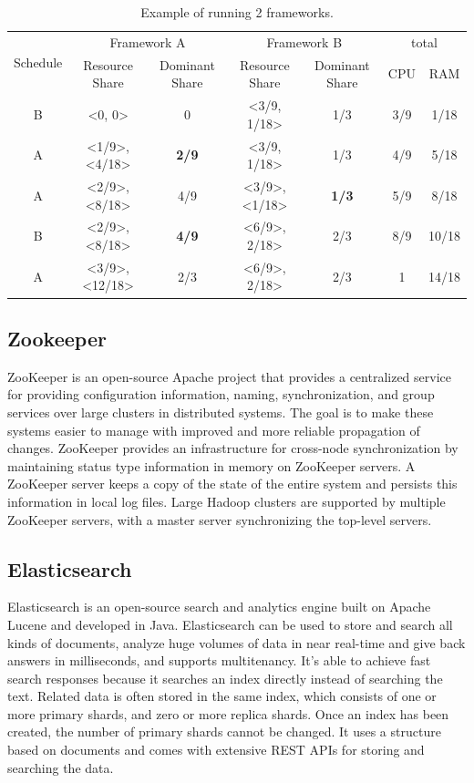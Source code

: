 \documentclass[12pt,oneside,openright,a4paper]{cpe-english-project}
\begin{document}
\begin{table}[!h]
  \caption{Example of running 2 frameworks.}\label{tbl:DRFTwoFramework}
  \begin{tabular}{|c|c|c|c|c|c|c|}
    \hline
    \multirow{2}{*}{Schedule} & \multicolumn{2}{c|}{Framework A}& \multicolumn{2}{c|}{Framework B}& \multicolumn{2}{c|}{total}\\ 
    \cline{2-7} & Resource Share & Dominant Share & Resource Share & Dominant Share & CPU & RAM \\ 
    \hline
    B  & <0, 0> & 0 & <3/9, 1/18> & 1/3 & 3/9 & 1/18 \\ 
    \hline
    A  & <1/9>, <4/18> & \textbf{2/9} & <3/9, 1/18> & 1/3 & 4/9 & 5/18 \\ 
    \hline
    A  & <2/9>, <8/18> & 4/9 & <3/9>, <1/18> & \textbf{1/3} & 5/9 & 8/18 \\ 
    \hline
    B  & <2/9>, <8/18> & \textbf{4/9} & <6/9>, 2/18> & 2/3 & 8/9 & 10/18 \\ 
    \hline
    A  & <3/9>, <12/18> & 2/3 & <6/9>, 2/18> & 2/3 & 1 & 14/18 \\ 
    \hline
  \end{tabular}
\end{table}

\subsection{Zookeeper}
\hspace{10mm}ZooKeeper is an open-source Apache project that provides a centralized service for providing configuration information, naming, synchronization, and group services over large clusters in distributed systems. The goal is to make these systems easier to manage with improved and more reliable propagation of changes. ZooKeeper provides an infrastructure for cross-node synchronization by maintaining status type information in memory on ZooKeeper servers. A ZooKeeper server keeps a copy of the state of the entire system and persists this information in local log files. Large Hadoop clusters are supported by multiple ZooKeeper servers, with a master server synchronizing the top-level servers. \cite{zookeeper}

\subsection{Elasticsearch}
\hspace{10mm}Elasticsearch is an open-source search and analytics engine built on Apache Lucene and developed in Java. Elasticsearch can be used to store and search all kinds of documents, analyze huge volumes of data in near real-time and give back answers in milliseconds, and supports multitenancy. It’s able to achieve fast search responses because it searches an index directly instead of searching the text. Related data is often stored in the same index, which consists of one or more primary shards, and zero or more replica shards. Once an index has been created, the number of primary shards cannot be changed. It uses a structure based on documents and comes with extensive REST APIs for storing and searching the data. 
\end{document}
